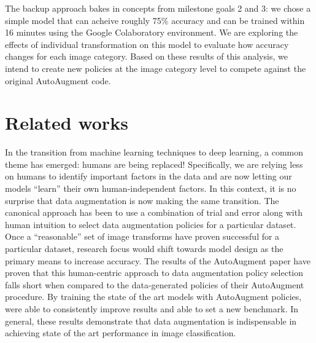 \documentclass[10pt,twocolumn,letterpaper]{article}
\begin{document}
	The backup approach bakes in concepts from milestone goals 2 and 3: we chose a simple model that can acheive roughly 75\% accuracy and can be trained within 16 minutes using the Google Colaboratory  environment. We are exploring the effects of individual transformation on this model to evaluate how accuracy changes for each image category. Based on these results of this analysis, we intend to create new policies at the image category level to compete against the original AutoAugment code. 

\section{Related works}

In the transition from machine learning techniques to deep learning, a common theme has emerged: humans are being replaced! Specifically, we are relying less on humans to identify important factors in the data and are now letting our models ``learn'' their own human-independent factors. In this context, it is no surprise that data augmentation is now making the same transition. The canonical approach has been to use a combination of trial and error along with human intuition to select data augmentation policies for a particular dataset. Once a ``reasonable'' set of image transforms have proven successful for a particular dataset, research focus would shift towards model design as the primary means to increase accuracy. The results of the AutoAugment paper have proven that this human-centric approach to data augmentation policy selection falls short when compared to the data-generated policies of their AutoAugment procedure. By training the state of the art models with AutoAugment policies, \cite{Cubuk2018} were able to consistently improve results and able to set a new benchmark. In general, these results demonstrate that data augmentation is indispensable in achieving state of the art performance in image classification. 
\end{document}
